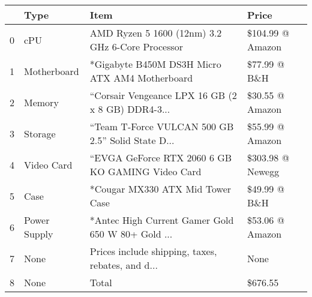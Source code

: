 \begin{tabular}{llll}
\toprule
{} &          Type &                                               Item &             Price \\
\midrule
0 &           cPU &   AMD Ryzen 5 1600 (12nm) 3.2 GHz 6-Core Processor &  \$104.99 @ Amazon \\
1 &   Motherboard &     *Gigabyte B450M DS3H Micro ATX AM4 Motherboard &      \$77.99 @ B\&H \\
2 &        Memory &  “Corsair Vengeance LPX 16 GB (2 x 8 GB) DDR4-3... &   \$30.55 @ Amazon \\
3 &       Storage &  “Team T-Force VULCAN 500 GB 2.5” Solid State D... &   \$55.99 @ Amazon \\
4 &    Video Card &   “EVGA GeForce RTX 2060 6 GB KO GAMING Video Card &  \$303.98 @ Newegg \\
5 &          Case &                   *Cougar MX330 ATX Mid Tower Case &      \$49.99 @ B\&H \\
6 &  Power Supply &  *Antec High Current Gamer Gold 650 W 80+ Gold ... &   \$53.06 @ Amazon \\
7 &          None &  Prices include shipping, taxes, rebates, and d... &              None \\
8 &          None &                                              Total &           \$676.55 \\
\bottomrule
\end{tabular}
